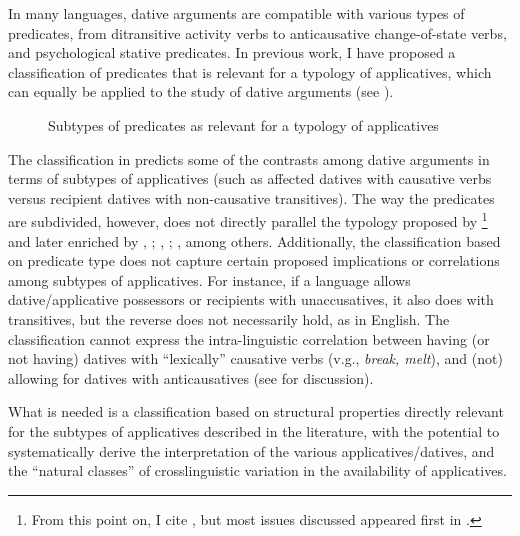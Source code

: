 \documentclass[output=paper,colorlinks,citecolor=brown,nonflat]{./langscibook}
\begin{document}
In many languages, dative arguments are compatible with various types of predicates, from ditransitive activity verbs to anticausative change-of-state verbs, and psychological stative predicates. In previous work, I have proposed a classification of predicates that is relevant for a typology of applicatives, which can equally be applied to the study of dative arguments (see ).

\begin{figure}
\caption{Subtypes of predicates as relevant for a typology of applicatives \citep[130]{Cuervo2015Chapter}}
\label{fig:cuervo:1}
\end{figure}

The classification in  predicts some of the contrasts among dative arguments in terms of subtypes of applicatives (such as affected datives with causative verbs versus recipient datives with non-causative transitives). The way the predicates are subdivided, however, does not directly parallel the typology proposed by \citep{Pylkkänen2002, Pylkkänen2008}\footnote{From this point on, I cite \citealt{Pylkkänen2008}, but most issues discussed appeared first in \citealt{Pylkkänen2002}.} and later enriched by \citealt{BonehNash2011WCCFL, Cuervo2003}, \citeyear{Cuervo2010Probus}; \citealt{Kim2011high, McGinnis2001}, \citeyear{McGinnis2008}; \citealt{McGinnisGerdts2004, RobergeTroberg2009}, among others. Additionally, the classification based on predicate type does not capture certain proposed implications or correlations among subtypes of applicatives. For instance, if a language allows dative/applicative possessors or recipients with unaccusatives, it also does with transitives, but the reverse does not necessarily hold, as in English. The classification cannot express the intra-linguistic correlation between having (or not having) datives with “lexically” causative verbs (v.g., \textit{break, melt}), and (not) allowing for datives with anticausatives (see \citealt{Peterson2007, Cuervo2015Chapter} for discussion). 

What is needed is a classification based on structural properties directly relevant for the subtypes of applicatives described in the literature, with the potential to systematically derive the interpretation of the various applicatives/datives, and the “natural classes” of crosslinguistic variation in the availability of applicatives.
\end{document}
